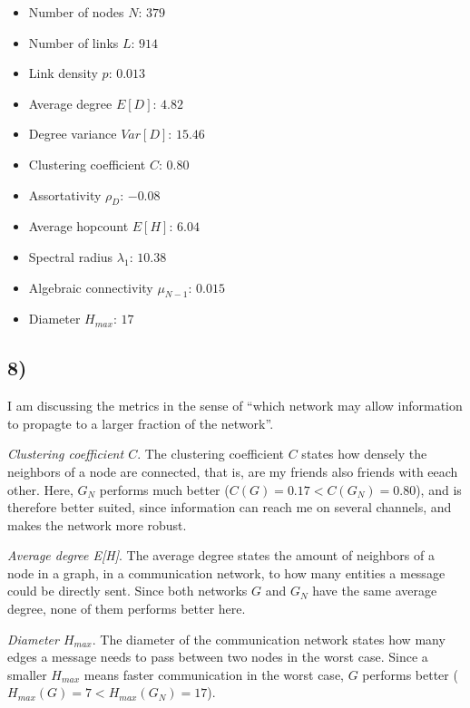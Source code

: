 \documentclass{article}
\begin{document}
\begin{itemize}
\item Number of nodes $N$: $379$
\item Number of links $L$: $914$
\item Link density $p$: $0.013$
\item Average degree $E[D]$: $4.82$
\item Degree variance $Var[D]$: $15.46$
\item Clustering coefficient $C$: $0.80$
\item Assortativity $\rho_D$: $-0.08$
\item Average hopcount $E[H]$: $6.04$
\item Spectral radius $\lambda_1$: $10.38$
\item Algebraic connectivity $\mu_{N-1}$: $0.015$
\item Diameter $H_{max}$: $17$
\end{itemize}

\subsection*{8)}

I am discussing the metrics in the sense of ``which network may allow
information to propagte to a larger fraction of the network''.
\vspace*{0.5em}

\noindent\emph{Clustering coefficient $C$}. The clustering coefficient $C$
states how densely the neighbors of a node are connected, that is, are
my friends also friends with eeach other. Here, $G_N$ performs much
better ($C(G) = 0.17 < C(G_N) = 0.80$), and is therefore better
suited, since information can reach me on several channels, and makes
the network more robust.

\vspace*{0.5em}
\noindent\emph{Average degree E[H]}. The average degree states the amount of
neighbors of a node in a graph, in a communication network, to how
many entities a message could be directly sent. Since both networks
$G$ and $G_N$ have the same average degree, none of them performs
better here.

\vspace*{0.5em}
\noindent\emph{Diameter $H_{max}$}. The diameter of the communication network
states how many edges a message needs to pass between two nodes in the
worst case. Since a smaller $H_{max}$ means faster communication in
the worst case, $G$ performs better ($H_{max}(G) = 7 < H_{max}(G_N) =
17$).
\end{document}
